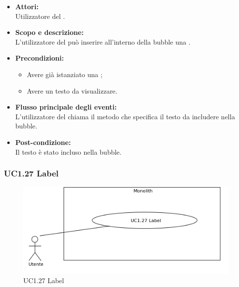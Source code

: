 \begin{itemize}
	\item \textbf{Attori:}
	\\Utilizzatore del .
	\item \textbf{Scopo e descrizione:} 
	\\L’utilizzatore del  può inserire all'interno della bubble una .
	\item \textbf{Precondizioni:}
	\begin{itemize}
		\item Avere già istanziato una ;
		\item Avere un testo da visualizzare.
	\end{itemize}
	\item \textbf{Flusso principale degli eventi:}
	\\L’utilizzatore del  chiama il metodo che specifica il testo da includere nella bubble.
	\item \textbf{Post-condizione:}
	\\Il testo è stato incluso nella bubble.
\end{itemize}

\subsubsection{UC1.27 Label} \label{UC1.27}

\begin{figure}[H]
	\centering
	\includegraphics[width=15cm]{../../documenti/AnalisiDeiRequisiti/Diagrammi_img/uc1_27.png}
	\caption{UC1.27 Label}
\end{figure}

